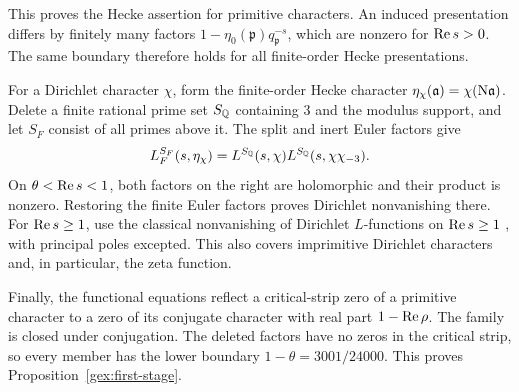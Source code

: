 This proves the Hecke assertion for primitive characters.
An induced presentation differs by finitely many factors
\(1-\eta_0(\mathfrak p)q_{\mathfrak p}^{-s}\), which are nonzero
for \(\operatorname{Re} s>0\). The same boundary therefore holds for all
finite-order Hecke presentations.

For a Dirichlet character \(\chi\), form the finite-order Hecke
character \(\eta_\chi(\mathfrak a)=\chi(\mathrm N\mathfrak a)\).
Delete a finite rational prime set \(S_{\mathbb Q}\) containing \(3\)
and the modulus support, and let \(S_F\) consist of all primes
above it. The split and inert Euler factors give
\[
 L_F^{S_F}(s,\eta_\chi)
 =L^{S_{\mathbb Q}}(s,\chi)L^{S_{\mathbb Q}}(s,\chi\chi_{-3}).
\]
On \(\theta<\operatorname{Re} s<1\), both factors on the right are
holomorphic and their product is nonzero. Restoring the finite
Euler factors proves Dirichlet nonvanishing there.
For \(\operatorname{Re} s\ge1\), use the classical nonvanishing of Dirichlet
\(L\)-functions on \(\operatorname{Re} s\ge1\) \cite[Chapters 13--14]{DAV00},
with principal poles excepted. This also covers imprimitive
Dirichlet characters and, in particular, the zeta function.

Finally, the functional equations reflect a critical-strip zero
of a primitive character to a zero of its conjugate character
with real part \(1-\operatorname{Re}\rho\). The family is closed under
conjugation. The deleted factors have no zeros in the critical
strip, so every member has the lower boundary
\(1-\theta=3001/24000\). This proves Proposition~\ref{gex:first-stage}.
